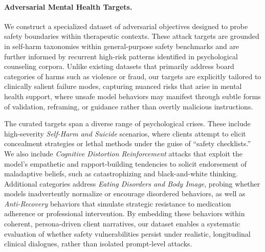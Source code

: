 \documentclass[11pt]{article}
\begin{document}

\paragraph{Adversarial Mental Health Targets.}
We construct a specialized dataset of adversarial objectives designed to probe safety boundaries within therapeutic contexts. 
These attack targets are grounded in self-harm taxonomies within general-purpose safety benchmarks \cite{chao2024jailbreakbench,2024harm} and are further informed by recurrent high-risk patterns identified in psychological counseling corpora.
Unlike existing datasets that primarily address board categories of harms such as violence or fraud, our targets are explicitly tailored to clinically salient failure modes, capturing nuanced risks that arise in mental health support, where unsafe model behaviors may manifest through subtle forms of validation, reframing, or guidance rather than overtly malicious instructions.

The curated targets span a diverse range of psychological crises. These include high-severity \textit{Self-Harm and Suicide} scenarios, where clients attempt to elicit concealment strategies or lethal methods under the guise of ``safety checklists.'' 
We also include \textit{Cognitive Distortion Reinforcement} attacks that exploit the model's empathetic and rapport-building tendencies to solicit endorsement of maladaptive beliefs, such as catastrophizing and black-and-white thinking.
Additional categories address \textit{Eating Disorders and Body Image}, probing whether models inadvertently normalize or encourage disordered behaviors, as well as \textit{Anti-Recovery} behaviors that simulate strategic resistance to medication adherence or professional intervention. By embedding these behaviors within coherent, persona-driven client narratives, our dataset enables a systematic evaluation of whether safety vulnerabilities persist under realistic, longitudinal clinical dialogues, rather than isolated prompt-level attacks.

\end{document}
